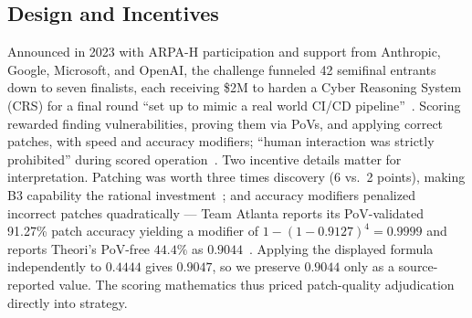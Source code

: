 \documentclass[conference,compsoc]{IEEEtran}
\begin{document}
\subsection{Design and Incentives}
Announced in 2023 with ARPA-H participation and support from Anthropic, Google, Microsoft, and
OpenAI, the challenge funneled 42 semifinal entrants down to seven finalists, each
receiving \$2M to harden a Cyber Reasoning System (CRS) for a final round ``set up to mimic a
real world CI/CD pipeline''~\cite{openssfaixcc2026}. Scoring rewarded finding vulnerabilities,
proving them via PoVs, and applying correct patches, with speed and accuracy modifiers;
``human interaction was strictly prohibited'' during scored operation~\cite{tobbuttercup2025}.
Two incentive details matter for interpretation. Patching was worth three times discovery
(6 vs.\ 2 points), making B3 capability the rational investment~\cite{taasc2024}; and accuracy
modifiers penalized incorrect patches quadratically --- Team Atlanta reports its PoV-validated
91.27\% patch accuracy yielding a modifier of $1-(1-0.9127)^4=0.9999$ and reports Theori's
PoV-free $44.4\%$ as $0.9044$~\cite{taafc2025}. Applying the displayed formula independently
to $0.4444$ gives $0.9047$, so we preserve $0.9044$ only as a source-reported value. The
scoring mathematics thus priced
patch-quality adjudication directly into strategy.
\end{document}

